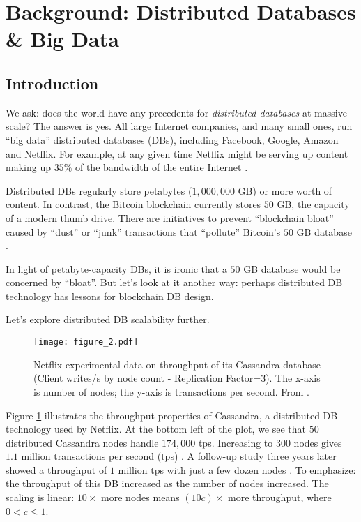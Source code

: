 \section{Background: Distributed Databases \& Big Data}\label{sec:distributed}

\subsection{Introduction}
We ask: does the world have any precedents for \textit{distributed databases} at massive scale? The answer is yes.
All large Internet companies, and many small ones, run “big data” distributed databases (DBs), including Facebook, Google, Amazon and Netflix.
For example, at any given time Netflix might be serving up content making up $35\%$ of the bandwidth of the entire Internet \cite{spangler2014netflix}.

Distributed DBs regularly store petabytes ($1,000,000$ GB) or more worth of content. 
In contrast, the Bitcoin blockchain currently stores $50$ GB, the capacity of a modern thumb drive.
There are initiatives to prevent “blockchain bloat” caused by “dust” or “junk” transactions that “pollute” Bitcoin’s $50$ GB database \cite{wagner2014blockchain_bloat}.

In light of petabyte-capacity DBs, it is ironic that a $50$ GB database would be concerned by “bloat”.
But let’s look at it another way: perhaps distributed DB technology has lessons for blockchain DB design.

\medskip
\centerline{Let’s explore distributed DB scalability further.}

\begin{figure}[!ht]
  \centering
  \texttt{[image: figure\_2.pdf]}
  \caption{Netflix experimental data on throughput of its Cassandra database (Client writes/s by node count - Replication Factor=$3$).
  The x-axis is number of nodes; the y-axis is transactions per second. From \cite{cockcroft2011benchmarking}.}
  \label{fig:cassandra_throughput}
\end{figure}

\medskip
Figure \ref{fig:cassandra_throughput} illustrates the throughput properties of Cassandra, a distributed DB technology used by Netflix.
At the bottom left of the plot, we see that $50$ distributed Cassandra nodes handle $174,000$ tps.
Increasing to $300$ nodes gives $1.1$ million transactions per second (tps) \cite{cockcroft2011benchmarking}.
A follow-up study three years later showed a throughput of $1$ million tps with just a few dozen nodes \cite{kalantzis_netflix}.
To emphasize: the throughput of this DB increased as the number of nodes increased. The scaling is linear: $10\times$ more nodes means $(10c)\times$ more throughput, where $0 < c \leq 1$.

